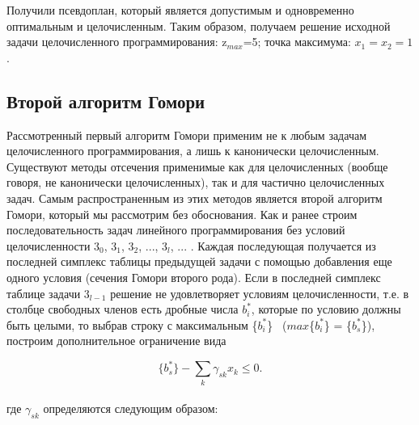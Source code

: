 Получили псевдоплан, который является допустимым и одновременно оптимальным и целочисленным. Таким образом, получаем решение исходной задачи целочисленного программирования: z$_{max}$=5; точка максимума: $ x_1 = x_2 = 1$.
\subsection{Второй алгоритм Гомори}

Рассмотренный первый алгоритм Гомори применим не к любым задачам целочисленного программирования, а лишь к канонически целочисленным. Существуют методы отсечения применимые как для целочисленных (вообще говоря, не канонически целочисленных), так и для частично целочисленных задач. Самым распространенным из этих методов является второй алгоритм Гомори, который мы рассмотрим без обоснования. Как и ранее строим последовательность
задач линейного программирования без условий целочисленности 3$_0$, 3$_1$, 3$_2$, ..., 3$_l$, ... .
Каждая последующая получается из последней симплекс таблицы предыдущей задачи с помощью добавления еще одного условия (сечения Гомори второго рода). Если в последней симплекс таблице задачи $3_{l-1}$ решение не удовлетворяет условиям целочисленности, т.е. в столбце свободных членов есть дробные числа $b_i^*$, которые по условию должны быть целыми, то выбрав строку с максимальным \{$b_i^*$\} \ ($max$\{$b_i^*$\} = \{$b_s^*$\}), построим дополнительное ограничение вида

\begin{equation}
\label{equation_5_5}
     \{b_s^*\} - \sum_k \gamma_{sk} x_k \leq 0.
\tag{$S_2$}
\end{equation}\\
где $\gamma_{sk}$ определяются следующим образом:

